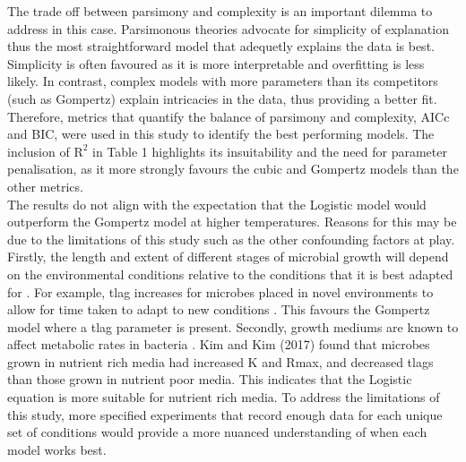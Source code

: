 \documentclass[12pt]{article}
\begin{document}
The trade off between parsimony and complexity is an important dilemma to address in this case. Parsimonous theories advocate for simplicity of explanation \cite{Coelho2019} thus the most straightforward model that adequetly explains the data is best. Simplicity is often favoured as it is more interpretable and overfitting is less likely. In contrast, complex models with more parameters than its competitors (such as Gompertz) explain intricacies in the data, thus providing a better fit. Therefore, metrics that quantify the balance of parsimony and complexity, AICc and BIC, were used in this study to identify the best performing models. The inclusion of $\mathrm{R}^2$ in Table 1 highlights its insuitability and the need for parameter penalisation, as it more strongly favours the cubic and Gompertz models than the other metrics.\\

The results do not align with the expectation that the Logistic model would outperform the Gompertz model at higher temperatures. Reasons for this may be due to the limitations of this study such as the other confounding factors at play. Firstly, the length and extent of different stages of microbial growth will depend on the environmental conditions relative to the conditions that it is best adapted for \cite{Dey2020}. For example, tlag increases for microbes placed in novel environments to allow for time taken to adapt to new conditions \cite{Rolfe2012}. This favours the Gompertz model where a tlag parameter is present. Secondly, growth mediums are known to affect metabolic rates in bacteria \cite{KIM201764}. Kim and Kim (2017) found that microbes grown in nutrient rich media had increased K and Rmax, and decreased tlags than those grown in nutrient poor media. This indicates that the Logistic equation is more suitable for nutrient rich media. To address the limitations of this study, more specified experiments that record enough data for each unique set of conditions would provide a more nuanced understanding of when each model works best.\\
\end{document}
